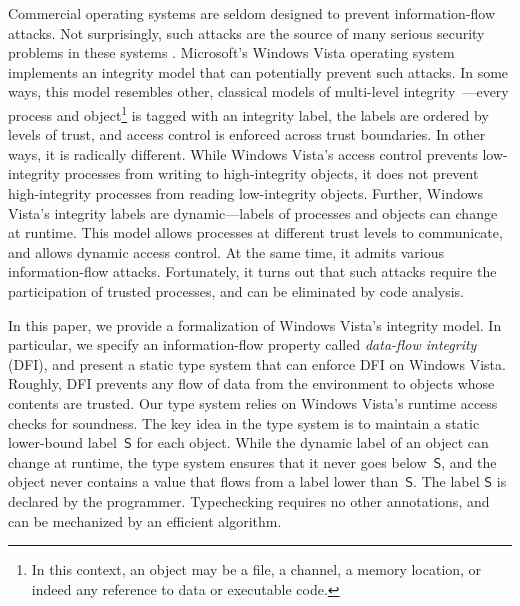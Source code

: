 \documentclass{sigplanconf}
\newcommand{\labb}{\mathsf S}
\begin{document}
Commercial operating systems are seldom designed to prevent information-flow attacks. Not surprisingly, such attacks are the source of many serious security problems in these systems \cite{sabelfeld}. Microsoft's Windows Vista operating system implements an integrity model that can potentially prevent such attacks. In some ways, this model resembles other, classical models of multi-level integrity~\cite{biba}---every process and object\footnote{In this context, an object may be a file, a channel, a memory location, or indeed any reference to data or executable code.} 
 is tagged with an integrity label, the labels are ordered by levels of trust, and access control is enforced across trust boundaries. In other ways, it is radically different. While Windows Vista's access control prevents
low-integrity processes from writing to high-integrity objects, it does not prevent high-integrity processes from reading low-integrity objects.
Further, Windows Vista's integrity labels are
dynamic---labels of processes and objects can change at runtime. This model allows
processes at different trust levels to communicate, and allows dynamic access control. At the same time, it admits various information-flow attacks. Fortunately, it turns out that such attacks require the participation of trusted processes, and can be eliminated by code analysis.

In this paper, we provide a formalization of Windows Vista's integrity model. In particular, we specify an information-flow property called {\em data-flow integrity} (DFI), and present a static type
system that can enforce DFI on Windows Vista. Roughly, DFI prevents any flow of data from the environment to
objects whose contents are trusted. Our type system relies on Windows Vista's
runtime access checks for soundness. The
key idea in the type system is to 
maintain a static lower-bound label~$\labb$ for each object. While the dynamic label of an object can change at runtime, the type system ensures that it
never goes below~$\labb$, and the object never contains a value that
flows from a label lower than~$\labb$.  The label $\labb$ is
declared by the programmer. Typechecking requires no other annotations, and can be mechanized by an efficient algorithm.
\end{document}
